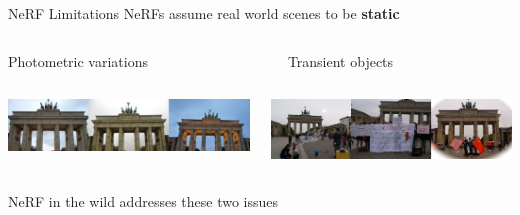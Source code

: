 \documentclass[aspectratio=1610,handout]{beamer}
\begin{document}
\begin{frame}{NeRF Limitations}
    NeRFs assume real world scenes to be \textbf{static}
    \vspace{1.5cm}
    \begin{columns}[t]
        \begin{column}{.4\textwidth}
            Photometric variations\\
        \end{column}
        \begin{column}{.4\textwidth}
            Transient objects\\
        \end{column}
    \end{columns}
    \begin{columns}
        \begin{column}{.4\textwidth}
            \begin{center}
                \includegraphics[width=\textwidth]{issues-var.png}
            \end{center}
        \end{column}
        \begin{column}{.4\textwidth}
            \begin{center}
                \includegraphics[width=\textwidth]{issues-transient.png}
            \end{center}
        \end{column}
    \end{columns}
    \vspace{1.5cm}
    \pause
    NeRF in the wild addresses these two issues
\end{frame}
\end{document}
